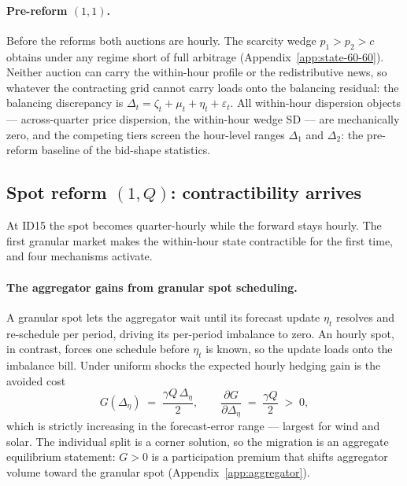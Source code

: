 \documentclass[11pt,a4paper]{article}
\theoremstyle{definition}
\theoremstyle{remark}
\theoremstyle{plain}
\begin{document}
\label{sec:theory:pre}
\paragraph{Pre-reform $(1,1)$.} Before the reforms both auctions are hourly. The \citeauthor{ito_reguant_2016} scarcity wedge $p_1 > p_2 > c$ obtains under any regime short of full arbitrage (Appendix~\ref{app:state-60-60}). Neither auction can carry the within-hour profile or the redistributive news, so whatever the contracting grid cannot carry loads onto the balancing residual: the balancing discrepancy is $\Delta_t = \zeta_t + \mu_t + \eta_t + \varepsilon_t$. All within-hour dispersion objects --- across-quarter price dispersion, the within-hour wedge SD --- are mechanically zero, and the competing tiers screen the hour-level ranges $\Delta_1$ and $\Delta_2$: the pre-reform baseline of the bid-shape statistics.

\subsection{Spot reform $(1,Q)$: contractibility arrives}\label{sec:theory:id15}

At ID15 the spot becomes quarter-hourly while the forward stays hourly. The first granular market makes the within-hour state contractible for the first time, and four mechanisms activate.


\paragraph{The aggregator gains from granular spot scheduling.} A granular spot lets the aggregator wait until its forecast update $\eta_t$ resolves and re-schedule per period, driving its per-period imbalance to zero. An hourly spot, in contrast, forces one schedule before $\eta_t$ is known, so the update loads onto the imbalance bill. Under uniform shocks the expected hourly hedging gain is the avoided cost
\begin{equation}
\boxed{\;G(\Delta_\eta) \;=\; \dfrac{\gamma Q \, \Delta_\eta}{2}, \qquad \dfrac{\partial G}{\partial \Delta_\eta} \;=\; \dfrac{\gamma Q}{2} \;>\; 0,\;}
\label{eq:shift}
\end{equation}
which is strictly increasing in the forecast-error range --- largest for wind and solar. The individual split is a corner solution, so the migration is an aggregate equilibrium statement: $G > 0$ is a participation premium that shifts aggregator volume toward the granular spot (Appendix~\ref{app:aggregator}).
\end{document}
